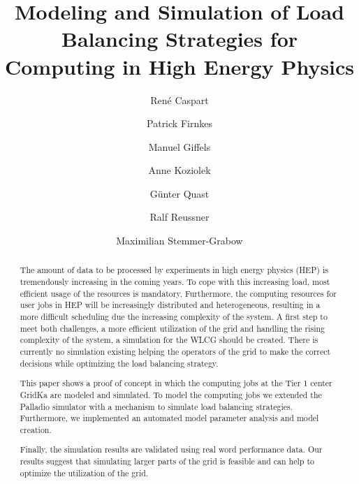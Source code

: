 \documentclass[runningheads,a4paper]{llncs}[2017/09/04]
\begin{document}
\title{Modeling and Simulation of Load Balancing Strategies for Computing in High Energy Physics}
{}


 \author{
Ren\'e Caspart \and
Patrick Firnkes \and
Manuel Giffels \and
Anne Koziolek \and
G\"unter Quast \and
Ralf Reussner \and
Maximilian Stemmer-Grabow
 }


%
{}
%

\maketitle

\begin{abstract}
The amount of data to be processed by experiments in high energy physics (HEP) is tremendously increasing in the coming years. To cope with this increasing load, most efficient usage of the resources is mandatory. Furthermore, the computing resources for user jobs in HEP will be increasingly distributed and heterogeneous, resulting in a more difficult scheduling due the increasing complexity of the system. 
A first step to meet both challenges, a more efficient utilization of the grid and handling the rising complexity of the system, a simulation for the WLCG should be created. There is currently no simulation existing helping the operators of the grid to make the correct decisions while optimizing the load balancing strategy.

This paper shows a proof of concept in which the computing jobs at the Tier 1 center GridKa are modeled and simulated. To model the computing jobs we extended the Palladio simulator with a mechanism to simulate load balancing strategies. Furthermore, we implemented an automated model parameter analysis and model creation.

Finally, the simulation results are validated using real word performance data. Our results suggest that simulating larger parts of the grid is feasible and can help to optimize the utilization of the grid.
\end{abstract}
\end{document}
